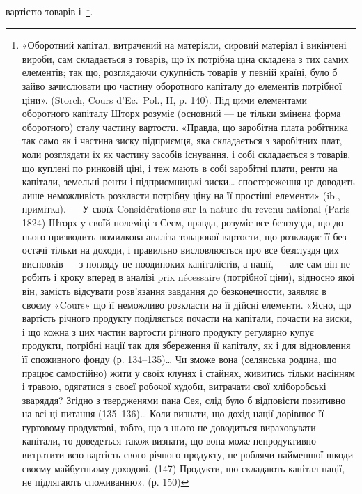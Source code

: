 вартістю товарів і~\footnote{
«Оборотний капітал, витрачений на матеріяли, сировий матеріял і викінчені вироби, сам
складається з товарів, що їх потрібна ціна складена з тих самих елементів; так що, розглядаючи
сукупність товарів у певній країні, було б зайво зачислювати цю частину оборотного капіталу до
елементів потрібної ціни». (Storch, Cours d’Ec.~Pol., II, p. 140). Під цими елементами оборотного
капіталу Шторх розуміє (основний — це тільки змінена форма оборотного) сталу частину вартости.
«Правда, що заробітна плата робітника так само як і частина зиску підприємця, яка складається з
заробітних плат, коли розглядати їх як частину засобів існування, і собі складається з товарів, що
куплені по ринковій ціні, і теж мають в собі заробітні плати, ренти на капітали, земельні ренти і
підприємницькі зиски\dots{} спостереження це доводить лише неможливість розкласти потрібну ціну на її
простіші елементи» (ib., примітка). — У своїх Considérations sur la nature du revenu national (Paris
1824)
Шторх y своїй полеміці з Сеєм, правда, розуміє все безглуздя, що до нього призводить помилкова
аналіза товарової вартости, що розкладає її без остачі тільки на доходи, і правильно висловлюється
про все безглуздя цих висновків — з погляду не поодиноких капіталістів, а нації, — але сам він не
робить і кроку вперед в аналізі prix nécessaire (потрібної ціни), відносно якої він, замість
відсувати розв’язання
завдання до безконечности, заявляє в своєму «Cours» що її неможливо розкласти на її дійсні елементи.
«Ясно, що вартість річного продукту поділяється почасти на капітали, почасти на зиски, і що кожна з
цих частин вартости річного продукту регулярно купує продукти, потрібні нації так для збереження її
капіталу, як і для відновлення її споживного фонду (р. 134--135)\dots{} Чи зможе вона (селянська родина,
що працює самостійно) жити у своїх клунях і стайнях, живитись тільки насінням
і травою, одягатися з своєї робочої худоби, витрачати свої хліборобські зваряддя? Згідно з
твердженями пана Сея, слід було б відповісти позитивно на всі ці питання (135--136)\dots{} Коли визнати, що
дохід нації дорівнює її гуртовому продуктові, тобто, що з нього не доводиться вираховувати капітали,
то доведеться також визнати, що вона може непродуктивно витратити всю вартість свого річного
продукту,
не роблячи найменшої шкоди своєму майбутньому доходові. (147) Продукти, що складають капітал нації,
не підлягають споживанню». (р. 150)
}.

